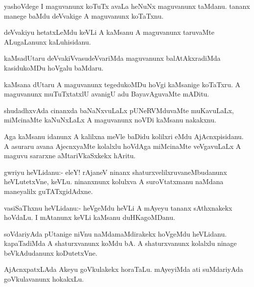 \begin{mng}
yashoVdege I maguvanunx koTuTx avaLa heNuNx maguvanunx taMdanu. tananx manege baMdu deVvakige A maguvanunx koTaTxnu.
\end{mng}

\begin{mng}
deVvakiyu hetatxLeMdu keVLi A kaMsanu A maguvanunx taruvaMte ALugaLanunx kaLuhisidanu.
\end{mng}

\begin{mng}
kaMsadUtaru deVvakiVvasudeVvariMda maguvanunx balAtAkxradiMda kasidukoMDu hoVgalu baMdaru.
\end{mng}

\begin{mng}
kaMsana dUtaru A maguvanunx tegedukoMDu hoVgi kaMsanige koTaTxru. A maguvanunx muTuTxtatxlU avanigU adu BayavAguvaMte mADitu.
\end{mng}

\begin{mng}
shudadhxvAda cinanxda baNaNxvuLaLx pUNeRVMduvaMte muKavuLaLx, miMcinaMte kaNuNxLaLx A maguvanunx noVDi kaMsanu nakakxnu.
\end{mng}

\begin{mng}
Aga kaMsanu idanunx A kalilxna meVle baDidu kolilxri eMdu AjAcnxpisidanu. A asuraru avana AjecnxyaMte kolalxlu hoVdAga miMcinaMte veVgavuLaLx A maguvu sararxne aMtariVkaSxkekx hAritu.
\end{mng}

\begin{mng}
gwriyu heVLidanu:- eleY! rAjaneV ninanx shaturxvelilxruvaneMbudanunx heVLutetxVne, keVLu. ninanxnunx kolulxva A suroVtatxmanu naMdana maneyalilx guTATxgidAdxne.
\end{mng}

\begin{mng}
vasiSaThxnu heVLidanu:- heVgeMdu heVLi A mAyeyu tananx sAthxnakekx hoVdaLu. I mAtanunx keVLi kaMsanu duHKagoMDanu.
\end{mng}

\begin{mng}
soVdariyAda pUtanige niVnu naMdamaMdirakekx hoVgeMdu heVLidanu. kapaTadiMda A shaturxvanunx koMdu bA. A shaturxvanunx kolalxlu ninage beVkAdudanunx koDutetxVne.
\end{mng}

\begin{mng}
AjAcnxpatxLAda Akeyu goVkulakekx horaTaLu. mAyeyiMda ati suMdariyAda goVkulavanunx hokakxLu.
\end{mng}

